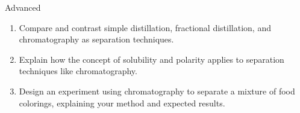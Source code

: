 \begin{tieredquestions}{Advanced}
\begin{enumerate}
    \item Compare and contrast simple distillation, fractional distillation, and chromatography as separation techniques.
    \item Explain how the concept of solubility and polarity applies to separation techniques like chromatography.
    \item Design an experiment using chromatography to separate a mixture of food colorings, explaining your method and expected results.
\end{enumerate}
\end{tieredquestions}
\FloatBarrier
